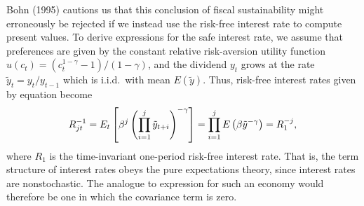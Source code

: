 Bohn (1995) cautions us that this conclusion of fiscal sustainability might
erroneously be rejected if we instead use the risk-free interest rate to
compute present values. To derive expressions for the safe interest rate,
we assume that preferences are given by the constant relative risk-aversion
utility function $u(c_t)=(c_t^{1-\gamma}-1)/(1-\gamma)$, and the dividend $y_t$
grows at the rate $\tilde y_t=y_t/y_{t-1}$ which is i.i.d.\ with mean
$E(\tilde y)$. Thus, risk-free interest rates given by equation
 become
$$
R_{jt}^{-1} = E_t \left[ {\beta}^j \left( \prod_{i=1}^j \tilde y_{t+i} \right)^{-\gamma}
                                                                         \right]
            = \prod_{i=1}^j E \left( {\beta} \tilde y^{-\gamma} \right)
 = R_{1}^{-j},
$$
where $R_{1}$ is the time-invariant one-period risk-free interest rate.
That is, the term structure of interest rates obeys the pure expectations
theory, since interest rates are nonstochastic. The analogue to
expression  for such an economy would therefore be one in which the
covariance term is zero.

